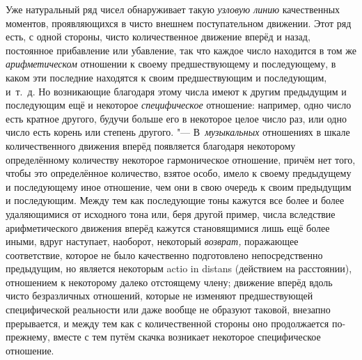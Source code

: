 Уже натуральный ряд чисел обнаруживает такую {\em узловую линию} качественных
моментов, проявляющихся в чисто внешнем поступательном движении. Этот ряд есть,
с одной стороны, чисто количественное движение вперёд и назад, постоянное
прибавление или убавление, так что каждое число находится в том же
{\em арифметическом} отношении к своему предшествующему и последующему, в каком
эти последние находятся к своим предшествующим и последующим, и~т.~д. Но
возникающие благодаря этому числа имеют к другим предыдущим и последующим ещё и
некоторое {\em специфическое} отношение: например, одно число есть кратное
другого, будучи больше его в некоторое целое число раз, или одно число есть
корень или степень другого. "--- В~{\em музыкальных} отношениях в шкале
количественного движения вперёд появляется благодаря некоторому определённому
количеству некоторое гармоническое отношение, причём нет того, чтобы это
определённое количество, взятое особо, имело к своему предыдущему и
последующему иное отношение, чем они в свою очередь к своим предыдущим и
последующим. Между тем как последующие тоны кажутся все более и более
удаляющимися от исходного тона или, беря другой пример, числа вследствие
арифметического движения вперёд кажутся становящимися лишь ещё более иными,
вдруг наступает, наоборот, некоторый {\em возврат,} поражающее соответствие,
которое не было качественно подготовлено непосредственно предыдущим, но
является некоторым actio in distans (действием на расстоянии), отношением к
некоторому далеко отстоящему члену; движение вперёд вдоль чисто безразличных
отношений, которые не изменяют предшествующей специфической реальности или даже
вообще не образуют таковой, внезапно прерывается, и между тем как с
количественной стороны оно продолжается по-прежнему, вместе с тем путём скачка
возникает некоторое специфическое отношение.

